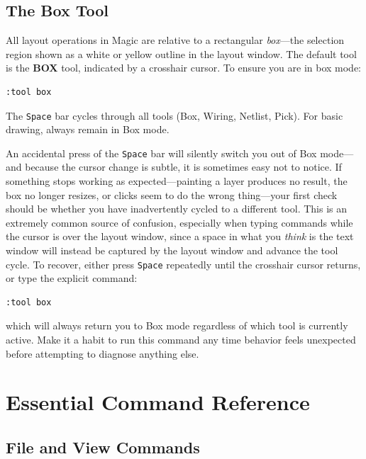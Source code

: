 \documentclass[11pt]{article}
\begin{document}
\subsection{The Box Tool}
All layout operations in Magic are relative to a rectangular
\emph{box}---the selection region shown as a white or yellow outline in
the layout window.
The default tool is the \textbf{BOX} tool, indicated by a crosshair
cursor.
To ensure you are in box mode:
\begin{lstlisting}
:tool box
\end{lstlisting}
The \texttt{Space} bar cycles through all tools (Box, Wiring, Netlist,
Pick).
For basic drawing, always remain in Box mode.
\clearpage

\begin{warnbox}
An accidental press of the \texttt{Space} bar will silently switch you
out of Box mode---and because the cursor change is subtle, it is sometimes
easy not to notice.
If something stops working as expected---painting a layer produces no
result, the box no longer resizes, or clicks seem to do the wrong
thing---your first check should be whether you have inadvertently cycled
to a different tool.
This is an extremely common source of confusion, especially when
typing commands while the cursor is over the layout window, since a
space in what you \emph{think} is the text window will instead be
captured by the layout window and advance the tool cycle.
To recover, either press \texttt{Space} repeatedly until the crosshair
cursor returns, or type the explicit command:
\begin{lstlisting}
:tool box
\end{lstlisting}
which will always return you to Box mode regardless of which tool is
currently active.
Make it a habit to run this command any time behavior feels
unexpected before attempting to diagnose anything else.
\end{warnbox}

\section{Essential Command Reference}

\subsection{File and View Commands}
\end{document}

